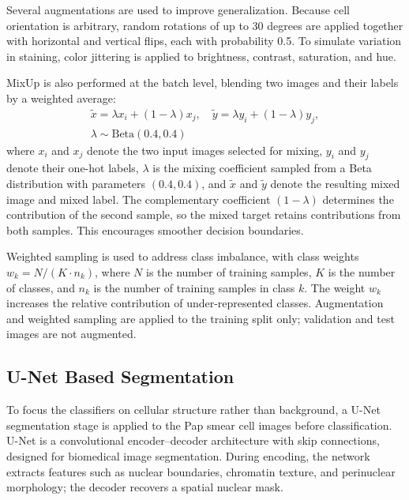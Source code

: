 \documentclass[conference]{IEEEtran}
\begin{document}
Several augmentations are used to improve generalization. Because cell orientation is arbitrary, random rotations of up to 30 degrees are applied together with horizontal and vertical flips, each with probability 0.5. To simulate variation in staining, color jittering is applied to brightness, contrast, saturation, and hue.

MixUp \cite{zhang2018mixup} is also performed at the batch level, blending two images and their labels by a weighted average:
\begin{equation}
\begin{gathered}
    \tilde{x}=\lambda x_i+(1{-}\lambda)x_j,\quad
    \tilde{y}=\lambda y_i+(1{-}\lambda)y_j,\\
    \lambda\sim\mathrm{Beta}(0.4,0.4)
\end{gathered}
    \label{eq:mixup}
\end{equation}
where $x_i$ and $x_j$ denote the two input images selected for mixing, $y_i$ and $y_j$ denote their one-hot labels, $\lambda$ is the mixing coefficient sampled from a Beta distribution with parameters $(0.4,0.4)$, and $\tilde{x}$ and $\tilde{y}$ denote the resulting mixed image and mixed label. The complementary coefficient $(1-\lambda)$ determines the contribution of the second sample, so the mixed target retains contributions from both samples. This encourages smoother decision boundaries.

Weighted sampling is used to address class imbalance, with class weights $w_k = N/(K\cdot n_k)$, where $N$ is the number of training samples, $K$ is the number of classes, and $n_k$ is the number of training samples in class $k$. The weight $w_k$ increases the relative contribution of under-represented classes. Augmentation and weighted sampling are applied to the training split only; validation and test images are not augmented.

\subsection{U-Net Based Segmentation}
\label{sec:unet}

To focus the classifiers on cellular structure rather than background, a U-Net \cite{ronneberger2015unet} segmentation stage is applied to the Pap smear cell images before classification. U-Net is a convolutional encoder--decoder architecture with skip connections, designed for biomedical image segmentation. During encoding, the network extracts features such as nuclear boundaries, chromatin texture, and perinuclear morphology; the decoder recovers a spatial nuclear mask.
\end{document}
